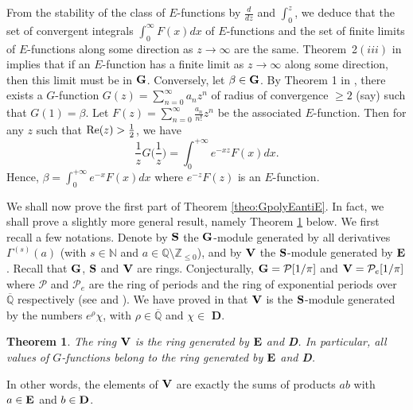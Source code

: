 \documentclass[reqno,12pt]{article}
\numberwithin{equation}{section}
\newtheorem{theo}{Theorem}
\theoremstyle{remark}
\newcommand{\N}{\mathbb{N}}
\newcommand{\Z}{\mathbb{Z}}
\newcommand{\Q}{\mathbb{Q}}
\newcommand{\Qbar}{\overline{\mathbb Q}}
\newcommand{\calP}{\mathcal P}
\newcommand{\GG}{{\bf G}}
\newcommand{\VV}{{\bf V}}
\newcommand{\EE}{{\bf E}}
\newcommand{\bfS}{{\bf S}}
\begin{document}
From the stability of the class of $E$-functions by $\frac{d}{dz}$ and $\int_0^z$, we deduce that the set of convergent integrals $\int_0^\infty F(x) dx$ of $E$-functions and the set of finite limits of $E$-functions along some direction as $z\to \infty$ are the same. Theorem~2$(iii)$ in \cite{ateo} implies that if an $E$-function has a finite limit as $z\to \infty$ along some direction, then this limit must be in ${\bf G}$. Conversely, let $\beta\in {\bf G}$. By Theorem 1 in \cite{gvalues}, there exists a $G$-function $G(z)=\sum_{n=0}^\infty a_n z^n$ of radius of convergence $\ge 2$ (say) such that $G(1)=\beta$. Let $F(z)=\sum_{n=0}^\infty \frac{a_n}{n!} z^n$ be the associated $E$-function. Then for any $z$ such that $\textup{Re}(z)>\frac12$, we have
$$
\frac{1}{z}G\Big(\frac{1}{z}\Big)=\int_0^{+\infty} e^{-xz}F(x)dx.
$$
Hence, $\beta=\int_0^{+\infty} e^{-x}F(x)dx$ where $e^{-z}F(z)$ is an $E$-function.

\medskip 



We shall now prove the first part of Theorem \ref{theo:GpolyEantiE}. In fact, we shall prove a slightly more general result, namely Theorem \ref{th5} below.  We first recall a few notations. Denote by 
$\bfS$  the $\GG$-module generated by all derivatives $\Gamma^{(s)}(a)$ (with $s\in\N$ and $a\in\Q\setminus\Z_{\leq 0}$), and by $\VV$ the $\bfS$-module generated by $\EE$.  Recall that $\GG$, $\bfS$ and $\VV$ are rings. Conjecturally, $\GG = \calP[1/\pi]$ and $\VV =  \calP_e[1/\pi]$  where $\calP$ and $\calP_e$ are the ring of periods and the ring of exponential periods over $\Qbar$ respectively (see \cite[\S 2.2]{gvalues} and \cite[\S 4.3]{fuchsien}).   We have proved in \cite[Theorem 3]{fuchsien} that $\VV$ is the $\bfS$-module generated by the numbers $e^\rho \chi$, with $\rho\in\Qbar$ and $\chi\in $ {\bf D}. 



\begin{theo}\label{th5}
The ring $\VV$ is the ring generated by $\EE$ and  {\bf D}. In particular, all  values of $G$-functions belong to the ring generated by $\EE$ and  {\bf D}. 
\end{theo}

In other words,  the elements of $\VV$ are exactly the sums of products $ab$ with $a\in\EE$ and $b \in  {\bf D}$. 
\end{document}
